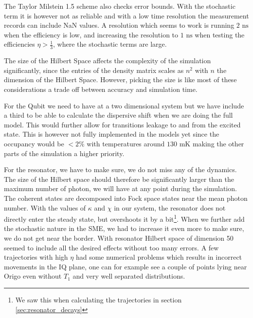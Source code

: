The Taylor Milstein 1.5 scheme also checks error bounds. With the stochastic term it is however not as reliable and with a low time resolution the measurement records can include NaN values. A resolution which seems to work is running $2 \text{ ns}$ when the efficiency is low, and increasing the resolution to $1 \text{ ns}$ when testing the efficiencies $\eta > \frac13$, where the stochastic terms are large. 

The size of the Hilbert Space affects the complexity of the simulation significantly, since the entries of the density matrix scales as $n^2$ with $n$ the dimension of the Hilbert Space. However, picking the size is like most of these considerations a trade off between accuracy and simulation time. 

For the Qubit we need to have at a two dimensional system but we have include a third to be able to calculate the dispersive shift when we are doing the full model. This would further allow for transitions leakage to and from the excited state. This is however not fully implemented in the models yet since the occupancy would be $<2\%$ with temperatures around $130$ mK making the other parts of the simulation a higher priority.

For the resonator, we have to make sure, we do not miss any of the dynamics. The size of the Hilbert space should therefore be significantly larger than the maximum number of photon, we will have at any point during the simulation. The coherent states are decomposed into Fock space states near the mean photon number. With the values of $\kappa$ and $\chi$ in our system, the resonator does not directly enter the steady state, but overshoots it by a bit\footnote[][1 cm]{We saw this when calculating the trajectories in section \ref{sec:resonator_decays}}. When we further add the stochastic nature in the SME, we had to increase it even more to make sure, we do not get near the border. With resonator Hilbert space of dimension 50 seemed to include all the desired effects without too many errors. A few trajectories with high $\eta$ had some numerical problems which results in incorrect movements in the IQ plane, one can for example see a couple of points lying near Origo even without $T_1$ and very well separated distributions. 

